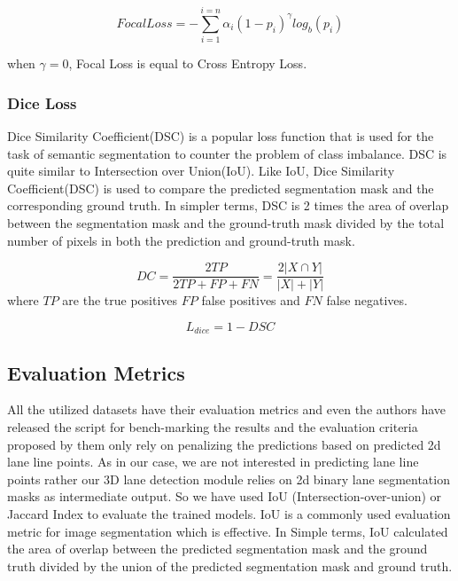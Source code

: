        \begin{equation}
            Focal Loss = - \sum^{i=n}_{i=1} \alpha_{i}(1-p_{i})^{\gamma} log_{b}(p_{i})
        \end{equation}
        
         when $\gamma = 0$, Focal Loss is equal to Cross Entropy Loss. 
        
        \subsubsection{Dice Loss}
        Dice Similarity Coefficient(DSC) is a popular loss function that is used for the task of semantic segmentation to counter the problem of class imbalance. DSC is quite similar to Intersection over Union(IoU). Like IoU, Dice Similarity Coefficient(DSC) is used to compare the predicted segmentation mask and the corresponding ground truth. In simpler terms, DSC is 2 times the area of overlap between the segmentation mask and the ground-truth mask divided by the total number of pixels in both the prediction and ground-truth mask.
        
        \begin{equation}
            DC = \frac{2TP}{2TP + FP + FN} = \frac{2|X \cap Y|}{|X| + |Y|}
        \end{equation}
    where $TP$ are the true positives $FP$ false positives and $FN$ false negatives.  
        
        \begin{equation}
            L_{dice} = 1 - DSC
        \end{equation}
        
        \subsection{Evaluation Metrics}
        All the utilized datasets have their evaluation metrics and even the authors have released the script for bench-marking the results and the evaluation criteria proposed by them only rely on penalizing the predictions based on predicted 2d lane line points. As in our case, we are not interested in predicting lane line points rather our 3D lane detection module relies on 2d binary lane segmentation masks as intermediate output. So we have used IoU (Intersection-over-union) or Jaccard Index to evaluate the trained models. IoU is a commonly used evaluation metric for image segmentation which is effective. In Simple terms, IoU calculated the area of overlap between the predicted segmentation mask and the ground truth divided by the union of the predicted segmentation mask and ground truth.
        
